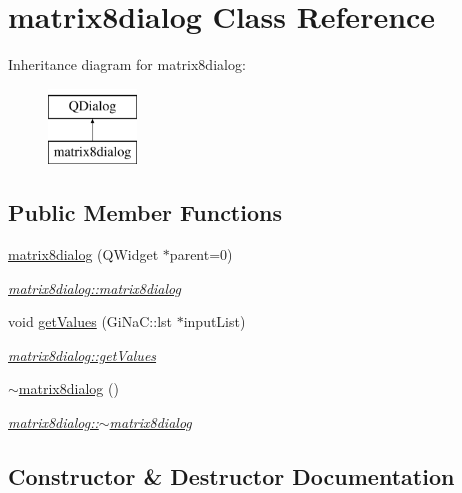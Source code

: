 \hypertarget{classmatrix8dialog}{}\section{matrix8dialog Class Reference}
\label{classmatrix8dialog}
Inheritance diagram for matrix8dialog\+:\begin{figure}[H]
\begin{center}
\leavevmode
\includegraphics[height=2.000000cm]{classmatrix8dialog}
\end{center}
\end{figure}
\subsection*{Public Member Functions}
\begin{DoxyCompactItemize}
\item 
\mbox{\hyperlink{classmatrix8dialog_afcdbf5b7f9fcef31cbd030cd130d57f9}{matrix8dialog}} (Q\+Widget $\ast$parent=0)
\begin{DoxyCompactList}\small\item\em \mbox{\hyperlink{classmatrix8dialog_afcdbf5b7f9fcef31cbd030cd130d57f9}{matrix8dialog\+::matrix8dialog}} \end{DoxyCompactList}\item 
void \mbox{\hyperlink{classmatrix8dialog_a74736300c5b1a4aa0291016991c7e508}{get\+Values}} (Gi\+Na\+C\+::lst $\ast$input\+List)
\begin{DoxyCompactList}\small\item\em \mbox{\hyperlink{classmatrix8dialog_a74736300c5b1a4aa0291016991c7e508}{matrix8dialog\+::get\+Values}} \end{DoxyCompactList}\item 
\mbox{\hyperlink{classmatrix8dialog_a2caefa9ac5a7cd24f3f7713f885fe792}{$\sim$matrix8dialog}} ()
\begin{DoxyCompactList}\small\item\em \mbox{\hyperlink{classmatrix8dialog_a2caefa9ac5a7cd24f3f7713f885fe792}{matrix8dialog\+::$\sim$matrix8dialog}} \end{DoxyCompactList}\end{DoxyCompactItemize}


\subsection{Constructor \& Destructor Documentation}
\mbox{\label{classmatrix8dialog_afcdbf5b7f9fcef31cbd030cd130d57f9}} 
